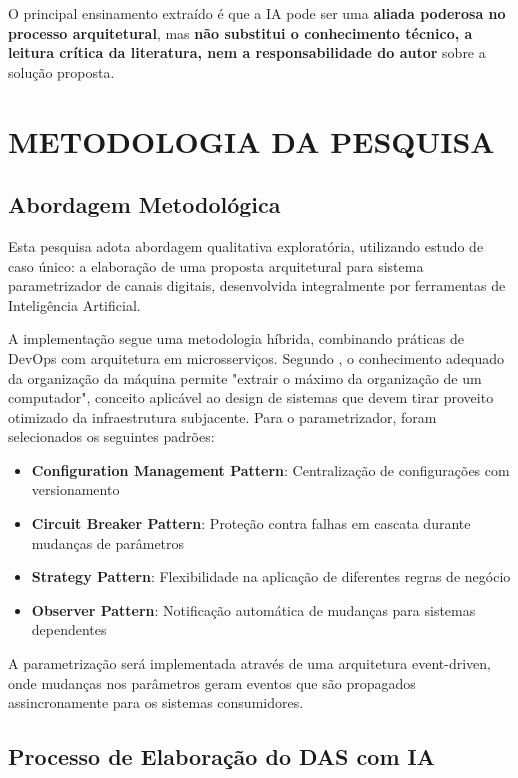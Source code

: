 O principal ensinamento extraído é que a IA pode ser uma \textbf{aliada poderosa no processo arquitetural}, mas \textbf{não substitui o conhecimento técnico, a leitura crítica da literatura, nem a responsabilidade do autor} sobre a solução proposta.

\chapter{METODOLOGIA DA PESQUISA}

\section{Abordagem Metodológica}

Esta pesquisa adota abordagem qualitativa exploratória, utilizando estudo de caso único: a elaboração de uma proposta arquitetural para sistema parametrizador de canais digitais, desenvolvida integralmente por ferramentas de Inteligência Artificial.

A implementação segue uma metodologia híbrida, combinando práticas de DevOps  com arquitetura em microsserviços. Segundo , o conhecimento adequado da organização da máquina permite "extrair o máximo da organização de um computador", conceito aplicável ao design de sistemas que devem tirar proveito otimizado da infraestrutura subjacente. Para o parametrizador, foram selecionados os seguintes padrões:

\begin{itemize}
    \item \textbf{Configuration Management Pattern}: Centralização de configurações com versionamento
    \item \textbf{Circuit Breaker Pattern}: Proteção contra falhas em cascata durante mudanças de parâmetros
    \item \textbf{Strategy Pattern}: Flexibilidade na aplicação de diferentes regras de negócio
    \item \textbf{Observer Pattern}: Notificação automática de mudanças para sistemas dependentes
\end{itemize}

A parametrização será implementada através de uma arquitetura event-driven, onde mudanças nos parâmetros geram eventos que são propagados assincronamente para os sistemas consumidores.

\section{Processo de Elaboração do DAS com IA}

